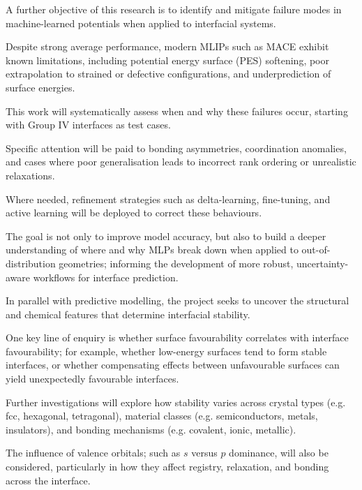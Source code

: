 \label{para:objectives_failure_modes} %

A further objective of this research is to identify and mitigate failure modes in machine-learned potentials when
applied to interfacial systems\nocite{}.

Despite strong average performance, modern MLIPs such as MACE exhibit known limitations, including potential energy
surface (PES) softening, poor extrapolation to strained or defective configurations, and underprediction of surface
energies\cite{}.

\label{para:objectives_failure_diagnostics} %

This work will systematically assess when and why these failures occur, starting with Group IV interfaces as test cases.

Specific attention will be paid to bonding asymmetries, coordination anomalies, and cases where poor generalisation
leads to incorrect rank ordering or unrealistic relaxations.

Where needed, refinement strategies such as delta-learning, fine-tuning, and active learning will be deployed to correct
these behaviours\cite{}.

The goal is not only to improve model accuracy, but also to build a deeper understanding of where and why MLPs break
down when applied to out-of-distribution geometries; informing the development of more robust, uncertainty-aware
workflows for interface prediction\nocite{}.

\label{para:objectives_structure_insight} %

In parallel with predictive modelling, the project seeks to uncover the structural and chemical features that determine
interfacial stability\nocite{}.

One key line of enquiry is whether surface favourability correlates with interface favourability; for example, whether
low-energy surfaces tend to form stable interfaces, or whether compensating effects between unfavourable surfaces can
yield unexpectedly favourable interfaces\nocite{}.

\label{para:objectives_structure_analysis} %

Further investigations will explore how stability varies across crystal types (e.g. fcc, hexagonal, tetragonal),
material classes (e.g. semiconductors, metals, insulators), and bonding mechanisms (e.g. covalent, ionic, metallic)\nocite{}.

The influence of valence orbitals; such as $s$ versus $p$ dominance, will also be considered, particularly in how they
affect registry, relaxation, and bonding across the interface\nocite{}.

